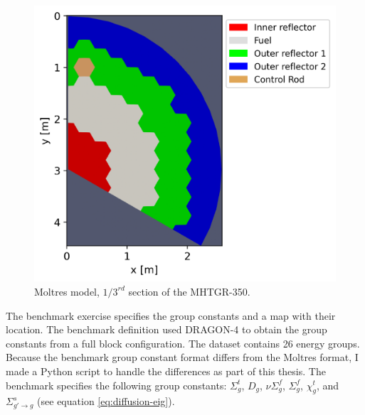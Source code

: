 \begin{figure}[htbp!]
	\centering
	\includegraphics[width=0.55\linewidth]{figures-neutronics/oecd-fullcore-legend}
	\hfill
	\caption{Moltres model, $1/3^{rd}$ section of the MHTGR-350.}
	\label{fig:bench-mesh}
\end{figure}


The benchmark exercise specifies the group constants and a map with their location.
The benchmark definition used DRAGON-4 \cite{marleau_user_2016} to obtain the group constants from a full block configuration.
The dataset contains 26 energy groups.
Because the benchmark group constant format differs from the Moltres format, I made a Python script to handle the differences as part of this thesis.
The benchmark specifies the following group constants: $\Sigma_g^t$, $D_g$, $\nu\Sigma_g^f$, $\Sigma_g^f$, $\chi_g^t$, and $\Sigma_{g'\rightarrow g}^s$ (see equation \ref{eq:diffusion-eig}).

